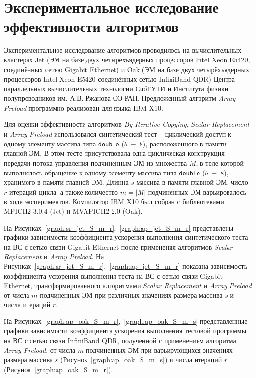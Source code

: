 \section{Экспериментальное исследование эффективности алгоритмов} \label{sect4_3}

Экспериментальное исследование алгоритмов проводилось на вычислительных кластерах Jet (ЭМ на базе двух четырёхъядерных процессоров Intel Xeon E5420, соединённых сетью 
Gigabit Ethernet) и Oak (ЭМ на базе двух четырёхъядерных процессоров Intel 
Xeon E5420 соединённых сетью InfiniBand QDR) Центра параллельных вычислительных 
технологий СибГУТИ и Института физики полупроводников им. А.В. Ржанова СО РАН. 
Предложенный алгоритм \textit{Array Preload} программно реализован для языка IBM X10.

Для оценки эффективности алгоритмов \textit{By-Iterative Copying}, \textit{Scalar Replacement} и \textit{Array Preload} использовался синтетический тест -- циклический доступ к одному элементу массива типа \texttt{double} ($b$~=~8), расположенного в памяти главной ЭМ. В этом тесте присутствовала одна циклическая конструкция передачи потока управления подчиненным ЭМ из множества $M$, в теле которой выполнялось обращение к одному элементу массива типа \texttt{double} ($b$~=~8), хранимого в памяти главной ЭМ. Длинна $s$ массива в памяти главной ЭМ, число $r$ итераций цикла, а также количество $m = |M|$ подчиненных ЭМ варьировалось в ходе экспериментов. Компилятор IBM X10 был собран с библиотеками MPICH2 3.0.4 (Jet) и MVAPICH2 2.0 (Oak).

На Рисунках~\ref{graph:sr_jet_S_m_r},~\ref{graph:ap_jet_S_m_r} представлены графики зависимости коэффициента ускорения выполнения синтетического теста на ВС с сетью связи Gigabit Ethernet после применения алгоритмов \textit{Scalar Replacement} и \textit{Array Preload}. На Рисунках~\ref{graph:sr_jet_S_m_r},~\ref{graph:ap_jet_S_m_r} показана зависимость коэффициента ускорения выполнения теста на ВС с сетью связи Gigabit Ethernet, трансформированного алгоритмами \textit{Scalar Replacement} и \textit{Array Preload} от числа $m$ подчиненных ЭМ при различных значениях размера массива $s$ и числа итераций $r$.

На Рисунках~\ref{graph:ap_oak_S_m_r},~\ref{graph:ap_oak_S_m_s} представленные графики зависимости коэффициента ускорения выполнения тестовой программы на ВС с сетью связи InfiniBand QDR, полученной с применением алгоритма \textit{Array Preload}, от числа $m$ подчиненных ЭМ при варьирующихся значениях размера массива $s$ (Рисунок~\ref{graph:ap_oak_S_m_s}) и числа итераций $r$ (Рисунок~\ref{graph:ap_oak_S_m_r}).

